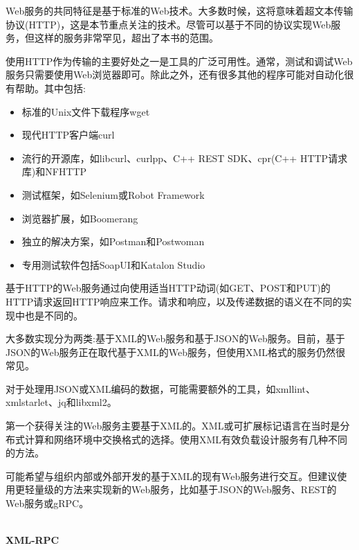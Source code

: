 
Web服务的共同特征是基于标准的Web技术。大多数时候，这将意味着超文本传输协议(HTTP)，这是本节重点关注的技术。尽管可以基于不同的协议实现Web服务，但这样的服务非常罕见，超出了本书的范围。


使用HTTP作为传输的主要好处之一是工具的广泛可用性。通常，测试和调试Web服务只需要使用Web浏览器即可。除此之外，还有很多其他的程序可能对自动化很有帮助。其中包括:

\begin{itemize}
\item 
标准的Unix文件下载程序wget

\item 
现代HTTP客户端curl

\item 
流行的开源库，如libcurl、curlpp、C++ REST SDK、cpr(C++ HTTP请求库)和NFHTTP

\item 
测试框架，如Selenium或Robot Framework

\item 
浏览器扩展，如Boomerang

\item 
独立的解决方案，如Postman和Postwoman

\item 
专用测试软件包括SoapUI和Katalon Studio
\end{itemize}

基于HTTP的Web服务通过向使用适当HTTP动词(如GET、POST和PUT)的HTTP请求返回HTTP响应来工作。请求和响应，以及传递数据的语义在不同的实现中也是不同的。

大多数实现分为两类:基于XML的Web服务和基于JSON的Web服务。目前，基于JSON的Web服务正在取代基于XML的Web服务，但使用XML格式的服务仍然很常见。

对于处理用JSON或XML编码的数据，可能需要额外的工具，如xmllint、xmlstarlet、jq和libxml2。


第一个获得关注的Web服务主要基于XML的。XML或可扩展标记语言在当时是分布式计算和网络环境中交换格式的选择。使用XML有效负载设计服务有几种不同的方法。

可能希望与组织内部或外部开发的基于XML的现有Web服务进行交互。但建议使用更轻量级的方法来实现新的Web服务，比如基于JSON的Web服务、REST的Web服务或gRPC。

\hspace*{\fill} \\ %
\noindent
\textbf{XML-RPC}

